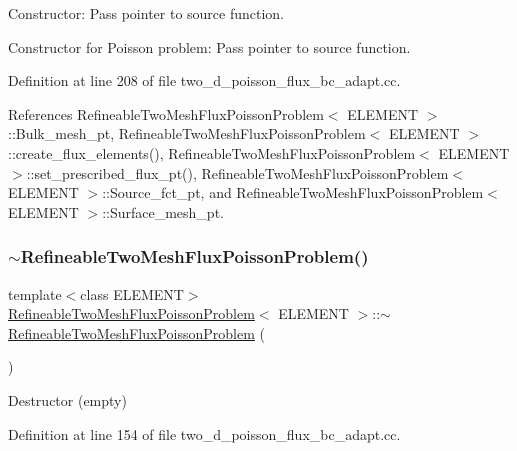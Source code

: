 Constructor\+: Pass pointer to source function. 

Constructor for Poisson problem\+: Pass pointer to source function. 

Definition at line 208 of file two\+\_\+d\+\_\+poisson\+\_\+flux\+\_\+bc\+\_\+adapt.\+cc.



References Refineable\+Two\+Mesh\+Flux\+Poisson\+Problem$<$ E\+L\+E\+M\+E\+N\+T $>$\+::\+Bulk\+\_\+mesh\+\_\+pt, Refineable\+Two\+Mesh\+Flux\+Poisson\+Problem$<$ E\+L\+E\+M\+E\+N\+T $>$\+::create\+\_\+flux\+\_\+elements(), Refineable\+Two\+Mesh\+Flux\+Poisson\+Problem$<$ E\+L\+E\+M\+E\+N\+T $>$\+::set\+\_\+prescribed\+\_\+flux\+\_\+pt(), Refineable\+Two\+Mesh\+Flux\+Poisson\+Problem$<$ E\+L\+E\+M\+E\+N\+T $>$\+::\+Source\+\_\+fct\+\_\+pt, and Refineable\+Two\+Mesh\+Flux\+Poisson\+Problem$<$ E\+L\+E\+M\+E\+N\+T $>$\+::\+Surface\+\_\+mesh\+\_\+pt.

\mbox{\label{classRefineableTwoMeshFluxPoissonProblem_a6b1f154c77ea0c415bf171764d34302f}} 
\subsubsection{\texorpdfstring{$\sim$\+Refineable\+Two\+Mesh\+Flux\+Poisson\+Problem()}{~RefineableTwoMeshFluxPoissonProblem()}}
{\footnotesize\ttfamily template$<$class E\+L\+E\+M\+E\+NT$>$ \\
\hyperlink{classRefineableTwoMeshFluxPoissonProblem}{Refineable\+Two\+Mesh\+Flux\+Poisson\+Problem}$<$ E\+L\+E\+M\+E\+NT $>$\+::$\sim$\hyperlink{classRefineableTwoMeshFluxPoissonProblem}{Refineable\+Two\+Mesh\+Flux\+Poisson\+Problem} (\begin{DoxyParamCaption}{ }\end{DoxyParamCaption})\hspace{0.3cm}{\ttfamily [inline]}}



Destructor (empty) 



Definition at line 154 of file two\+\_\+d\+\_\+poisson\+\_\+flux\+\_\+bc\+\_\+adapt.\+cc.



